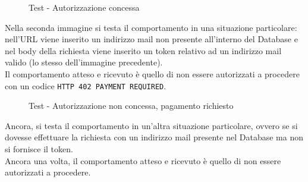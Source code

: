 \begin{figure}[h]
	\centering
	\caption{Test - Autorizzazione concessa}
	\label{fig:auth}
\end{figure}
Nella seconda immagine si testa il comportamento in una situazione particolare: nell'URL viene inserito un indirizzo mail non presente all'interno 
del Database e nel body della richiesta viene inserito un token relativo ad un indirizzo mail valido (lo stesso dell'immagine precedente).\\
Il comportamento atteso e ricevuto è quello di non essere autorizzati a procedere con un codice \texttt{HTTP 402 PAYMENT REQUIRED}.

\begin{figure}[h]
	\centering
	\caption{Test - Autorizzazione non concessa, pagamento richiesto}
	\label{fig:payment}
\end{figure}

Ancora, si testa il comportamento in un'altra situazione particolare, ovvero se si dovesse effettuare la richiesta con un indirizzo mail presente nel Database 
ma non si fornisce il token.\\
Ancora una volta, il comportamento atteso e ricevuto è quello di non essere autorizzati a procedere.

